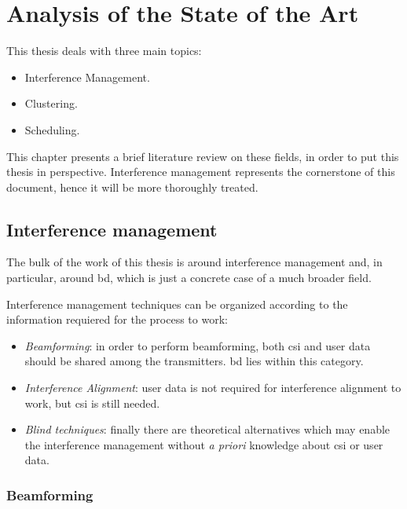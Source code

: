 \chapter[State of the Art]{Analysis of the State of the Art}\label{ch:state_art}

This thesis deals with three main topics:

\begin{itemize}
   \item Interference Management.
   \item Clustering.
   \item Scheduling.
\end{itemize}

This chapter presents a brief literature review on these fields, in order to put
this thesis in perspective. Interference management represents the cornerstone
of this document, hence it will be more thoroughly treated.

\section{Interference management} \label{sec:sa_interf}

The bulk of the work of this thesis is around interference management and, in
particular, around \gls{bd}, which is just a concrete case of a much broader
field.

Interference management techniques can be organized according to the information
requiered for the process to work:

\begin{itemize}
    \item \emph{Beamforming}: in order to perform beamforming, both \gls{csi}
        and user data should be shared among the transmitters. \gls{bd} lies
        within this category.
    \item \emph{Interference Alignment}: user data is not required for
        interference alignment to work, but \gls{csi} is still needed.
    \item \emph{Blind techniques}: finally there are theoretical alternatives
        which may enable the interference management without \emph{a priori}
        knowledge about \gls{csi} or user data.
\end{itemize}

\subsection{Beamforming} \label{ssec:sa_bf}


